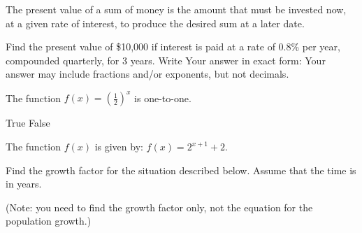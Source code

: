\documentclass[11pt,answers]{exam}
\begin{document}
\begin{questions}


\addpoints



\question[2] The present value of a sum of money is the amount that must be invested now, at a given rate of interest, to produce the desired sum at a later date. 

Find the present value of \$10,000 if interest is paid at a rate of 0.8\% per year, compounded quarterly, for 3 years. Write Your answer in exact form: Your answer may include fractions and/or exponents, but not decimals.

\fillwithdottedlines{2cm}
\bonusquestion[1]  The function $\displaystyle f(x)=\left (\frac{1}{2}\right )^x$ is one-to-one.
\begin{oneparchoices}
	\choice True
	\choice False
\end{oneparchoices}

\question The function $f(x)$ is given by: $\displaystyle f(x) = 2^{x+1}+2$. 

\question[1]  Find the growth factor for the situation described below. Assume that the time is in years.

{}

(Note: you need to find the growth factor only, not the equation for the population growth.)

		\fillwithdottedlines{2cm}
\end{questions}
\end{document}
